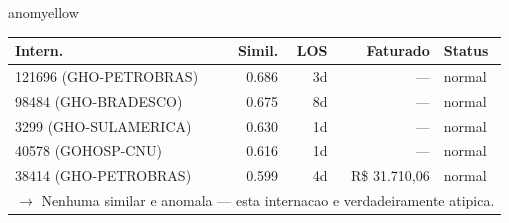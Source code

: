 \documentclass[a4paper,10pt]{article}
\begin{document}
\begin{anomalycard}[Internacao 185666 | PASA | MODERADO (z=2.23)]{anomyellow}
\begin{tabular}{l r r r l}\toprule\textbf{Intern.} & \textbf{Simil.} & \textbf{LOS} & \textbf{Faturado} & \textbf{Status} \\\midrule
121696 (GHO-PETROBRAS) & 0.686 & 3d & --- & \textcolor{jcubeblue}{normal} \\
98484 (GHO-BRADESCO) & 0.675 & 8d & --- & \textcolor{jcubeblue}{normal} \\
3299 (GHO-SULAMERICA) & 0.630 & 1d & --- & \textcolor{jcubeblue}{normal} \\
40578 (GOHOSP-CNU) & 0.616 & 1d & --- & \textcolor{jcubeblue}{normal} \\
38414 (GHO-PETROBRAS) & 0.599 & 4d & R\$ 31.710,06 & \textcolor{jcubeblue}{normal} \\
\multicolumn{5}{l}{\textcolor{jcubeblue}{\small $\rightarrow$ Nenhuma similar e anomala --- esta internacao e verdadeiramente atipica.}} \\
\bottomrule\end{tabular}


\end{anomalycard}

\newpage
\end{document}
